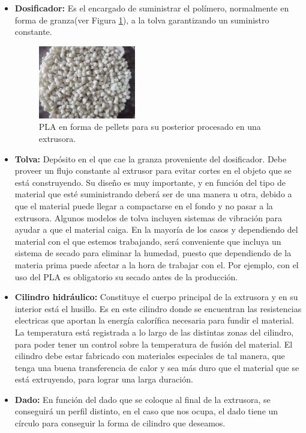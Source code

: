 \begin{itemize}
    \item \textbf{Dosificador:} Es el encargado de suministrar el polímero, normalmente en forma de granza(ver Figura \ref{fig:Pellets_PLA}), a la tolva garantizando un suministro constante. 
     \begin{figure}[!ht]
        \centering
        \includegraphics[width=0.4\textwidth]{images/PLA-Pellets.jpg}
        \caption[Pellets de PLA]{PLA en forma de pellets para su posterior procesado en una extrusora.}
        \label{fig:Pellets_PLA}
    \end{figure}
    \item \textbf{Tolva:} Depósito en el que cae la granza proveniente del dosificador. Debe proveer un flujo constante al extrusor para evitar cortes en el objeto que se está construyendo. Su diseño es muy importante, y en función del tipo de material que esté suministrando deberá ser de una manera u otra, debido a que el material puede llegar a compactarse en el fondo y no pasar a la extrusora. Algunos modelos de tolva incluyen sistemas de vibración para ayudar a que el material caiga. En la mayoría de los casos y dependiendo del material con el que estemos trabajando, será conveniente que incluya un sistema de secado para eliminar la humedad, puesto que dependiendo de la materia prima puede afectar a la hora de trabajar con el. Por ejemplo, con el uso del PLA es obligatorio su secado antes de la producción.
    \item \textbf{Cilindro hidráulico:} Constituye el cuerpo principal de la extrusora y en su interior está el husillo. Es en este cilindro donde se encuentran las resistencias electricas que aportan la energía calorífica necesaria para fundir el material. La temperatura está registrada a lo largo de las distintas zonas del cilindro, para poder tener un control sobre la temperatura de fusión del material. El cilindro debe estar fabricado con materiales especiales de tal manera, que tenga una buena transferencia de calor y sea más duro que el material que se está extruyendo, para lograr una larga duración.
    \item \textbf{Dado:} En función del dado que se coloque al final de la extrusora, se conseguirá un perfil distinto, en el caso que nos ocupa, el dado tiene un círculo para conseguir la forma de cilindro que deseamos.


\end{itemize}
